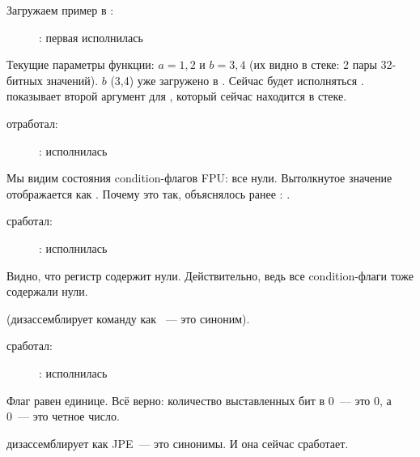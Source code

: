 ﻿\clearpage
{}
\myindex{\olly}

Загружаем пример в \olly:

\begin{figure}[H]
\centering
{}
\caption{\olly: первая \FLD исполнилась}
\label{fig:FPU_comparison_case1_olly1}
\end{figure}

Текущие параметры функции: $a=1,2$ и $b=3,4$ 
(их видно в стеке: 2 пары 32-битных значений).
$b$ (3,4) уже загружено в .
Сейчас будет исполняться \FCOMP. 
\olly показывает второй аргумент для \FCOMP, который сейчас находится в стеке.

\clearpage
\FCOMP отработал:

\begin{figure}[H]
\centering
{}
\caption{\olly: \FCOMP исполнилась}
\label{fig:FPU_comparison_case1_olly2}
\end{figure}

Мы видим состояния condition-флагов \ac{FPU}: 
все нули.
Вытолкнутое значение отображается как . Почему это так, объяснялось ранее%
: 
.

\clearpage
\FNSTSW сработал:
\begin{figure}[H]
\centering
{}
\caption{\olly: \FNSTSW исполнилась}
\label{fig:FPU_comparison_case1_olly3}
\end{figure}

Видно, что регистр  содержит нули. Действительно, ведь все condition-флаги тоже содержали нули.

(\olly дизассемблирует команду \FNSTSW как ~---%
 это синоним).

\clearpage
\TEST сработал:

\begin{figure}[H]
\centering
{}
\caption{\olly: \TEST исполнилась}
\label{fig:FPU_comparison_case1_olly4}
\end{figure}

Флаг  равен единице.
Всё верно: количество выставленных бит в 0~--- это 0, а 0~--- это четное число.

\olly дизассемблирует  как \ac{JPE}~--- это синонимы.
И она сейчас сработает.

